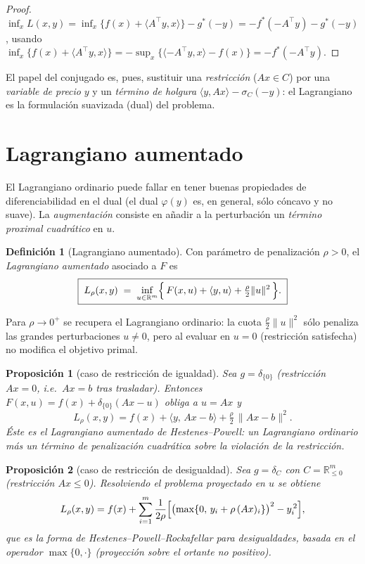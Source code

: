 \documentclass[12pt]{book}
\newcommand{\R}{\mathbb{R}}
\newcommand{\indic}{\delta}
\newcommand{\supp}{\sigma}
\theoremstyle{definition}
\newtheorem{definicion}{Definición}[section]
\theoremstyle{plain}
\newtheorem{proposicion}{Proposición}[section]
\theoremstyle{remark}
\begin{document}
\begin{proof}
  $\inf_x L(x,y)
  =\inf_x\{f(x)+\langle A^{\!\top}y,x\rangle\}-g^*(-y)
  =-f^*(-A^{\!\top}y)-g^*(-y)$,
  usando
  $\inf_x\{f(x)+\langle A^{\!\top}y,x\rangle\}
  =-\sup_x\{\langle -A^{\!\top}y,x\rangle-f(x)\}
  =-f^*(-A^{\!\top}y)$.
\end{proof}

El papel del conjugado es, pues, sustituir una \emph{restricción}
($Ax\in C$) por una \emph{variable de precio} $y$ y un
\emph{término de holgura} $\langle y,Ax\rangle-\supp_C(-y)$: el
Lagrangiano es la formulación suavizada (dual) del problema.

\section{Lagrangiano aumentado}\label{sec:aug}

El Lagrangiano ordinario puede fallar en tener buenas propiedades de
diferenciabilidad en el dual (el dual $\varphi(y)$ es, en general,
sólo cóncavo y no suave).  La \emph{augmentación} consiste en añadir a
la perturbación un \emph{término proximal cuadrático} en $u$.

\begin{definicion}[Lagrangiano aumentado]
  Con parámetro de penalización $\rho>0$, el \emph{Lagrangiano
  aumentado} asociado a $F$ es
  \[
    \boxed{\;
    L_\rho(x,y)
    \;=\;
    \inf_{u\in\R^m}\Bigl\{\,
      F(x,u)+\langle y,u\rangle+\tfrac{\rho}{2}\|u\|^2
    \,\Bigr\}.
    \;}
  \]
\end{definicion}

Para $\rho\to 0^+$ se recupera el Lagrangiano ordinario: la cuota
$\tfrac{\rho}{2}\|u\|^2$ sólo penaliza las grandes perturbaciones
$u\neq0$, pero al evaluar en $u=0$ (restricción satisfecha) no
modifica el objetivo primal.

\begin{proposicion}[caso de restricción de igualdad]
  Sea $g=\indic_{\{0\}}$ (restricción $Ax=0$, i.e.\ $Ax=b$ tras
  trasladar).  Entonces $F(x,u)=f(x)+\indic_{\{0\}}(Ax-u)$ obliga a
  $u=Ax$ y
  \[
    \boxed{\;
    L_\rho(x,y)=f(x)+\langle y,\, Ax-b\rangle
               +\tfrac{\rho}{2}\,\|Ax-b\|^2.
    \;}
  \]
  Éste es el \emph{Lagrangiano aumentado de Hestenes--Powell}:
  un Lagrangiano ordinario más un \emph{término de penalización
  cuadrática} sobre la violación de la restricción.
\end{proposicion}

\begin{proposicion}[caso de restricción de desigualdad]
  Sea $g=\indic_{C}$ con $C=\R^m_{\le 0}$ (restricción $Ax\le0$).
  Resolviendo el problema proyectado en $u$ se obtiene
  \[
    L_\rho(x,y)
    = f(x)+\sum_{i=1}^m
      \frac{1}{2\rho}\Bigl[
        \bigl(\max\{0,\,y_i+\rho\, (Ax)_i\}\bigr)^2 - y_i^{\,2}
      \Bigr],
  \]
  que es la \emph{forma de Hestenes--Powell--Rockafellar} para
  desigualdades, basada en el operador $\max\{0,\cdot\}$ (proyección
  sobre el ortante no positivo).
\end{proposicion}
\end{document}
